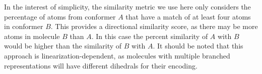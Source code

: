 \documentclass[%
 preprint,
superscriptaddress,
 amsmath,amssymb,
 aip,
 jcp,
]{revtex4-2}
\begin{document}
In the interest of simplicity, the similarity metric we use here only considers the percentage of atoms from conformer $A$ that have a match of at least four atoms in conformer $B$.
This provides a directional similarity score, as there may be more atoms in molecule $B$ than $A$.
In this case the percent similarity of $A$ with $B$ would be higher than the similarity of $B$ with $A$.
It should be noted that this approach is linearization-dependent, as molecules with multiple branched representations will have different dihedrals for their encoding.


\end{document}
